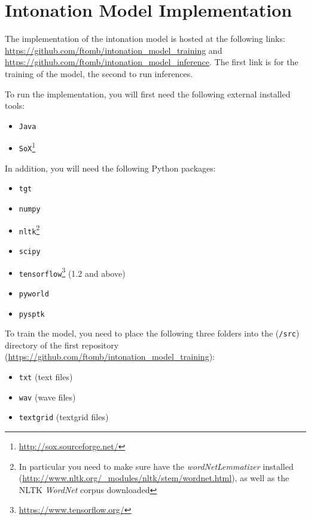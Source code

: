 \section{Intonation Model Implementation}

The implementation of the intonation model is hosted at the following links: \url{https://github.com/ftomb/intonation_model_training} and \url{https://github.com/ftomb/intonation_model_inference}.
The first link is for the training of the model, the second to run inferences.

To run the implementation, you will first need the following external installed tools:

\begin{itemize}[noitemsep]
    \item \verb|Java|
    \item \verb|SoX|\footnote{\url{http://sox.sourceforge.net/}}
\end{itemize}

In addition, you will need the following Python packages:

\begin{itemize}[noitemsep]
    \item \verb|tgt|
    \item \verb|numpy|
    \item \verb|nltk|\footnote{In particular you need to make sure have the \emph{wordNetLemmatizer} installed (\url{http://www.nltk.org/_modules/nltk/stem/wordnet.html}), as well as the NLTK \emph{WordNet} corpus downloaded}
    \item \verb|scipy|
    \item \verb|tensorflow|\footnote{\url{https://www.tensorflow.org/}} (1.2 and above)
    \item \verb|pyworld|
    \item \verb|pysptk|
\end{itemize}

To train the model, you need to place the following three folders into the (\verb|/src|) directory of the first repository (\url{https://github.com/ftomb/intonation_model_training}):

\begin{itemize}[noitemsep]
    \item \verb|txt| (text files)
    \item \verb|wav| (wave files)
    \item \verb|textgrid| (textgrid files)
\end{itemize}


